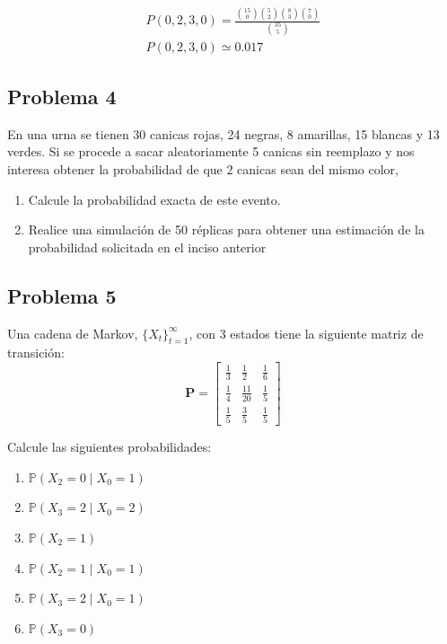 \documentclass{article}
\begin{document}
            \begin{gather*}
                P(0, 2, 3, 0) = \frac{\binom{15}{0} \binom{5}{2} \binom{8}{3} \binom{7}{0}}{\binom{35}{5}} \\
                P(0, 2, 3, 0) \simeq 0.017
            \end{gather*}

        \subsection*{Problema 4}

            En una urna se tienen 30 canicas rojas, 24 negras, 8 amarillas, 15 blancas y 13 verdes. Si se procede a sacar aleatoriamente 5 canicas sin reemplazo y nos interesa obtener la probabilidad de que 2 canicas sean del mismo color, 
            \begin{enumerate}
                \item Calcule la probabilidad exacta de este evento.
                \item Realice una simulación de 50 réplicas para obtener una estimación de la probabilidad solicitada en el inciso anterior
            \end{enumerate}

        \subsection*{Problema 5}

            Una cadena de Markov, $\{X_t\}_{t=1}^{\infty}$, con 3 estados tiene la siguiente matriz de transición:
            \begin{equation*}
                \mathbf{P} = \begin{bmatrix}
                    \frac{1}{3} & \frac{1}{2} & \frac{1}{6} \\[6pt]
                    \frac{1}{4} & \frac{11}{20} & \frac{1}{5} \\[6pt]
                    \frac{1}{5} & \frac{3}{5} & \frac{1}{5}
                \end{bmatrix}
            \end{equation*}

            Calcule las siguientes probabilidades:
            \begin{enumerate}
                \item $\mathbb{P}(X_2 = 0 \mid X_0 = 1)$
                \item $\mathbb{P}(X_3 = 2 \mid X_0 = 2)$
                \item $\mathbb{P}(X_2 = 1)$
                \item $\mathbb{P}(X_2 = 1 \mid X_0 = 1)$
                \item $\mathbb{P}(X_3 = 2 \mid X_0 = 1)$
                \item $\mathbb{P}(X_3 = 0)$
            \end{enumerate}
            
\end{document}
